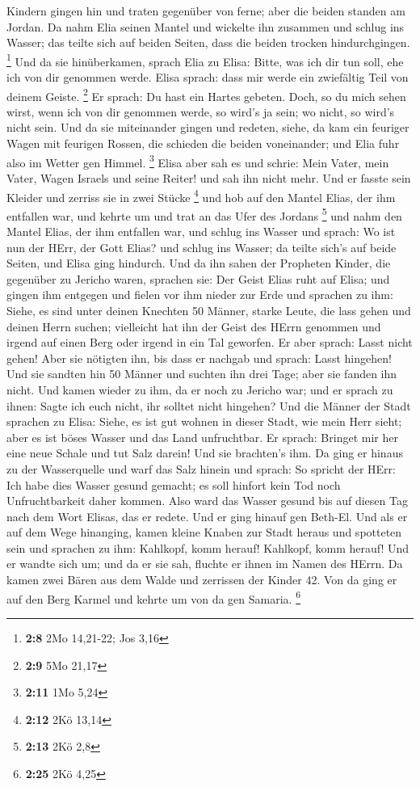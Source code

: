 Kindern gingen hin und traten gegenüber von ferne; aber die beiden
standen am Jordan.  Da nahm Elia seinen Mantel und wickelte
ihn zusammen und schlug ins Wasser; das teilte sich auf beiden Seiten,
dass die beiden trocken hindurchgingen. \footnote{\textbf{2:8} 2Mo
  14,21-22; Jos 3,16}  Und da sie hinüberkamen, sprach Elia
zu Elisa: Bitte, was ich dir tun soll, ehe ich von dir genommen werde.
Elisa sprach: dass mir werde ein zwiefältig Teil von deinem Geiste.
\footnote{\textbf{2:9} 5Mo 21,17}  Er sprach: Du hast ein
Hartes gebeten. Doch, so du mich sehen wirst, wenn ich von dir genommen
werde, so wird's ja sein; wo nicht, so wird's nicht sein. 
Und da sie miteinander gingen und redeten, siehe, da kam ein feuriger
Wagen mit feurigen Rossen, die schieden die beiden voneinander; und Elia
fuhr also im Wetter gen Himmel. \footnote{\textbf{2:11} 1Mo 5,24}
 Elisa aber sah es und schrie: Mein Vater, mein Vater,
Wagen Israels und seine Reiter! und sah ihn nicht mehr. Und er fasste
sein Kleider und zerriss sie in zwei Stücke \footnote{\textbf{2:12} 2Kö
  13,14}  und hob auf den Mantel Elias, der ihm entfallen
war, und kehrte um und trat an das Ufer des Jordans \footnote{\textbf{2:13}
  2Kö 2,8}  und nahm den Mantel Elias, der ihm entfallen
war, und schlug ins Wasser und sprach: Wo ist nun der HErr, der Gott
Elias? und schlug ins Wasser; da teilte sich's auf beide Seiten, und
Elisa ging hindurch.  Und da ihn sahen der Propheten
Kinder, die gegenüber zu Jericho waren, sprachen sie: Der Geist Elias
ruht auf Elisa; und gingen ihm entgegen und fielen vor ihm nieder zur
Erde  und sprachen zu ihm: Siehe, es sind unter deinen
Knechten 50 Männer, starke Leute, die lass gehen und deinen Herrn
suchen; vielleicht hat ihn der Geist des HErrn genommen und irgend auf
einen Berg oder irgend in ein Tal geworfen. Er aber sprach: Lasst nicht
gehen!  Aber sie nötigten ihn, bis dass er nachgab und
sprach: Lasst hingehen! Und sie sandten hin 50 Männer und suchten ihn
drei Tage; aber sie fanden ihn nicht.  Und kamen wieder zu
ihm, da er noch zu Jericho war; und er sprach zu ihnen: Sagte ich euch
nicht, ihr solltet nicht hingehen?  Und die Männer der
Stadt sprachen zu Elisa: Siehe, es ist gut wohnen in dieser Stadt, wie
mein Herr sieht; aber es ist böses Wasser und das Land unfruchtbar.
 Er sprach: Bringet mir her eine neue Schale und tut Salz
darein! Und sie brachten's ihm.  Da ging er hinaus zu der
Wasserquelle und warf das Salz hinein und sprach: So spricht der HErr:
Ich habe dies Wasser gesund gemacht; es soll hinfort kein Tod noch
Unfruchtbarkeit daher kommen.  Also ward das Wasser gesund
bis auf diesen Tag nach dem Wort Elisas, das er redete. 
Und er ging hinauf gen Beth-El. Und als er auf dem Wege hinanging, kamen
kleine Knaben zur Stadt heraus und spotteten sein und sprachen zu ihm:
Kahlkopf, komm herauf! Kahlkopf, komm herauf!  Und er
wandte sich um; und da er sie sah, fluchte er ihnen im Namen des HErrn.
Da kamen zwei Bären aus dem Walde und zerrissen der Kinder 42.
 Von da ging er auf den Berg Karmel und kehrte um von da
gen Samaria. \footnote{\textbf{2:25} 2Kö 4,25}

